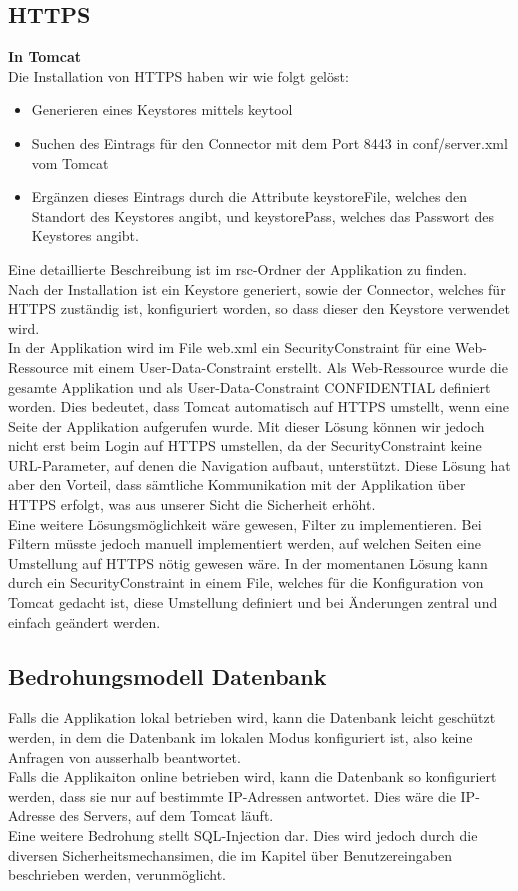 \documentclass[12pt]{scrartcl}
\begin{document}
\subsection{HTTPS}
\textbf{In Tomcat}\\
Die Installation von HTTPS haben wir wie folgt gelöst:
\begin{itemize}
	\item Generieren eines Keystores mittels keytool
	\item Suchen des Eintrags für den Connector mit dem Port 8443 in conf/server.xml vom Tomcat
	\item Ergänzen dieses Eintrags durch die Attribute keystoreFile, welches den Standort des Keystores angibt, und keystorePass, welches das Passwort des Keystores angibt.
\end{itemize}
Eine detaillierte Beschreibung ist im rsc-Ordner der Applikation zu finden.\\
Nach der Installation ist ein Keystore generiert, sowie der Connector, welches für HTTPS zuständig ist, konfiguriert worden, so dass dieser den Keystore verwendet wird.\\
In der Applikation wird im File web.xml ein SecurityConstraint für eine Web-Ressource mit einem User-Data-Constraint erstellt. Als Web-Ressource wurde die gesamte Applikation und als User-Data-Constraint CONFIDENTIAL definiert worden. Dies bedeutet, dass Tomcat automatisch auf HTTPS umstellt, wenn eine Seite der Applikation aufgerufen wurde. Mit dieser Lösung können wir jedoch nicht erst beim Login auf HTTPS umstellen, da der SecurityConstraint keine URL-Parameter, auf denen die Navigation aufbaut, unterstützt. Diese Lösung hat aber den Vorteil, dass sämtliche Kommunikation mit der Applikation über HTTPS erfolgt, was aus unserer Sicht die Sicherheit erhöht.\\
Eine weitere Lösungsmöglichkeit wäre gewesen, Filter zu implementieren. Bei Filtern müsste jedoch manuell implementiert werden, auf welchen Seiten eine Umstellung auf HTTPS nötig gewesen wäre. In der momentanen Lösung kann durch ein SecurityConstraint in einem File, welches für die Konfiguration von Tomcat gedacht ist, diese Umstellung definiert und bei Änderungen zentral und einfach geändert werden.

\subsection{Bedrohungsmodell Datenbank}
Falls die Applikation lokal betrieben wird, kann die Datenbank leicht geschützt werden, in dem die Datenbank im lokalen Modus konfiguriert ist, also keine Anfragen von ausserhalb beantwortet.\\
Falls die Applikaiton online betrieben wird, kann die Datenbank so konfiguriert werden, dass sie nur auf bestimmte IP-Adressen antwortet. Dies wäre die IP-Adresse des Servers, auf dem Tomcat läuft.\\
Eine weitere Bedrohung stellt SQL-Injection dar. Dies wird jedoch durch die diversen Sicherheitsmechansimen, die im Kapitel über Benutzereingaben beschrieben werden, verunmöglicht.
\end{document}
